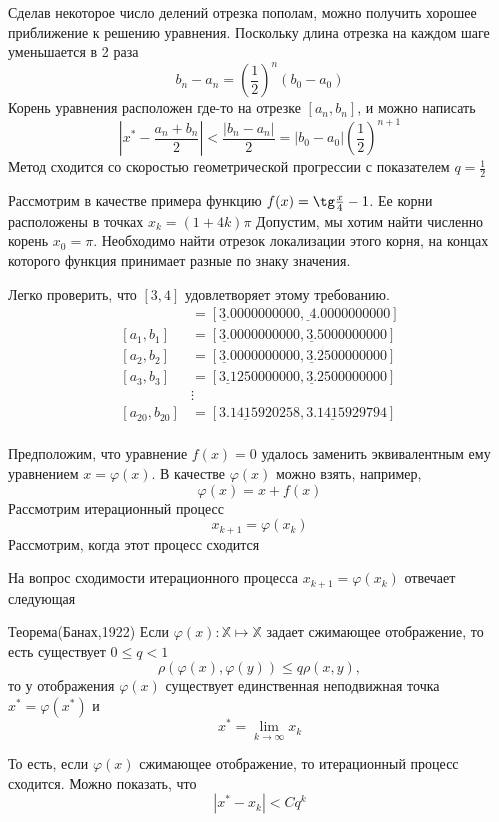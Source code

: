 \documentclass[professionalfonts,compress,unicode]{beamer}
\begin{document}
{	
	Сделав некоторое число делений отрезка пополам,
	можно получить хорошее приближение к решению уравнения. Поскольку длина отрезка на каждом шаге уменьшается в 2 раза
	$$b_n - a_n = \left(\frac{1}{2}\right)^n (b_0 - a_0)$$
	Корень уравнения расположен где-то на отрезке $[a_n, b_n]$, и можно написать
	$$
	\left|x^* - \frac{a_n+b_n}{2}\right| < \frac{|b_n - a_n|}{2} = |b_0 - a_0| \left(\frac{1}{2}\right)^{n+1}
	$$
	Метод сходится со скоростью геометрической прогрессии с показателем $q = \frac{1}{2}$
}

{
	Рассмотрим в качестве примера функцию $f(x) = \tg \frac{x}{4} - 1$. Ее корни расположены в точках $x_k = (1 + 4k) \pi$
	Допустим, мы хотим найти численно корень $x_0 = \pi$. Необходимо найти отрезок локализации этого корня, на концах которого функция 
	принимает разные по знаку значения. 
	
	Легко проверить, что $[3,4]$ удовлетворяет этому требованию.
	\begin{align*}
		[a_{0},b_{0}] &= [\underline{3.}0000000000, \underline{}4.0000000000]\\
		[a_{1},b_{1}] &= [\underline{3.}0000000000, \underline{3.}5000000000]\\
		[a_{2},b_{2}] &= [\underline{3.}0000000000, \underline{3.}2500000000]\\
		[a_{3},b_{3}] &= [\underline{3.1}250000000, \underline{3.}2500000000]\\
		&\vdots\\
		[a_{20},b_{20}] &= [\underline{3.141592}0258, \underline{3.141592}9794]\\	
	\end{align*}
}

{
	Предположим, что уравнение $f(x) = 0$ удалось заменить эквивалентным ему уравнением $x = \varphi(x)$. 
	В качестве $\varphi(x)$ можно взять, например, 
	$$
	\varphi(x) = x + f(x)
	$$
	Рассмотрим итерационный процесс 
	$$
	x_{k+1} = \varphi(x_k)
	$$
	Рассмотрим, когда этот процесс сходится
}

{
	На вопрос сходимости итерационного процесса $x_{k+1} = \varphi(x_k)$ отвечает следующая 
	\begin{block}{Теорема(Банах,1922)}
		Если $\varphi(x): \mathbb{X} \mapsto \mathbb{X}$ задает сжимающее отображение, то есть существует $0 \leq q < 1$
		$$
		\rho(\varphi(x),\varphi(y)) \leq q \rho(x,y),
		$$
		то у отображения $\varphi(x)$ существует единственная неподвижная точка $x^* = \varphi(x^*)$ и 
		$$
		x^* = \lim_{k \rightarrow \infty} x_k
		$$
	\end{block}
	То есть, если $\varphi(x)$ сжимающее отображение, то итерационный процесс сходится. Можно показать, что
	$$
	|x^* - x_k| < C q^k
	$$
}
\end{document}
